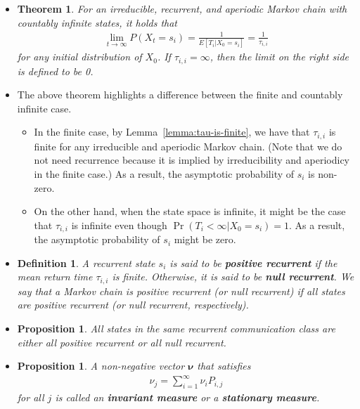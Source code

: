 \documentclass[10pt]{article}
\newtheorem{theorem}[lemma]{Theorem}
\newtheorem{definition}[lemma]{Definition}
\newtheorem{proposition}[lemma]{Proposition}
\newcommand{\ves}[1]{\boldsymbol{#1}}
\begin{document}
\begin{itemize}
  \item \begin{theorem}
    For an irreducible, recurrent, and aperiodic Markov chain with countably infinite states, it holds that
    \begin{align*}
        \lim_{t \rightarrow \infty} P(X_t = s_i) = \frac{1}{E[T_i|X_0 = s_i]} = \frac{1}{\tau_{i,i}}
    \end{align*}
    for any initial distribution of $X_0$. If $\tau_{i,i} = \infty$, then the limit on the right side is defined to be 0.
  \end{theorem}

  \item The above theorem highlights a difference between the finite and countably infinite case.
  \begin{itemize}
    \item In the finite case, by Lemma~\ref{lemma:tau-is-finite}, we have that $\tau_{i,i}$ is finite for any irreducible and aperiodic Markov chain. (Note that we do not need recurrence because it is implied by irreducibility and aperiodicy in the finite case.) As a result, the asymptotic probability of $s_i$ is non-zero.
    
    \item On the other hand, when the state space is infinite, it might be the case that $\tau_{i,i}$ is infinite even though $\Pr(T_i < \infty | X_0 = s_i) = 1$. As a result, the asymptotic probability of $s_i$ might be zero.
  \end{itemize}

  \item \begin{definition}
    A recurrent state $s_i$ is said to be {\bf positive recurrent} if the mean return time $\tau_{i,i}$ is finite. Otherwise, it is said to be {\bf null recurrent}. We say that a Markov chain is positive recurrent (or null recurrent) if all states are positive recurrent (or null recurrent, respectively).
  \end{definition}

  \item \begin{proposition}
    All states in the same recurrent communication class are either all positive recurrent or all null recurrent.
  \end{proposition}

  \item \begin{proposition}
    A non-negative vector $\ves{\nu}$ that satisfies
    \begin{align*}
        \nu_j = \sum_{i=1}^\infty \nu_i P_{i,j}
    \end{align*}
    for all $j$ is called an {\bf invariant measure} or a {\bf stationary measure}.
  \end{proposition}


\end{itemize}
\end{document}

